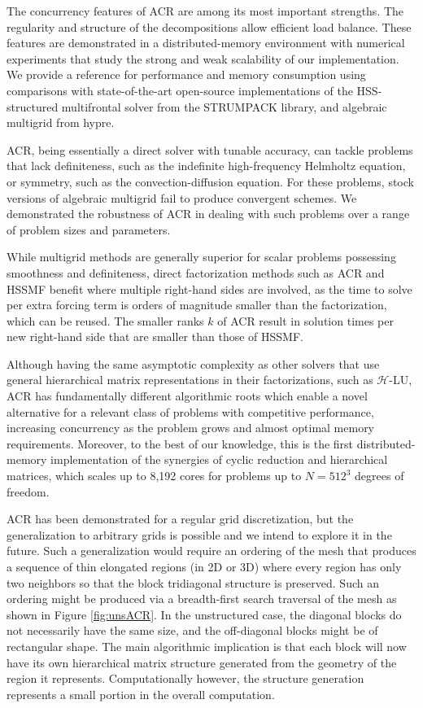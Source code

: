 \documentclass[]{elsarticle}
\begin{document}
The concurrency features of ACR are among its most important strengths. The regularity and structure of the decompositions allow efficient load balance. These features are demonstrated in a distributed-memory environment with numerical experiments that study the strong and weak scalability of our implementation. We provide a reference for performance and memory consumption using comparisons with state-of-the-art open-source implementations of the HSS-structured multifrontal solver from the STRUMPACK library, and algebraic multigrid from hypre. 

ACR, being essentially a direct solver with tunable accuracy, can tackle problems that lack definiteness, such as the indefinite high-frequency Helmholtz equation, or symmetry, such as the convection-diffusion equation.
For these problems, stock versions of algebraic multigrid fail to produce convergent schemes. We demonstrated the robustness of ACR in dealing with such problems over a range of problem sizes and parameters.

While multigrid methods are generally superior for scalar problems possessing smoothness and definiteness, direct factorization methods such as ACR and HSSMF benefit where multiple right-hand sides are involved, as the time to solve per extra forcing term is orders of magnitude smaller than the factorization, which can be reused. The smaller ranks $k$ of ACR result in solution times per new right-hand side that are smaller than those of HSSMF.

Although having the same asymptotic complexity as other solvers that use general hierarchical matrix representations in their factorizations, such as $\mathcal{H}$-LU, ACR has fundamentally different algorithmic roots which enable a novel alternative for a relevant class of problems with competitive performance, increasing concurrency as the problem grows and almost optimal memory requirements. Moreover, to the best of our knowledge, this is the first distributed-memory implementation of the synergies of cyclic reduction and hierarchical matrices, which scales up to 8,192 cores for problems up to $N=512^3$ degrees of freedom.

ACR has been demonstrated for a regular grid discretization, but the generalization to arbitrary grids is possible and we intend to explore it in the future. Such a generalization would require an ordering of the mesh that produces a sequence of thin elongated regions (in 2D or 3D) where every region has only two neighbors so that the block tridiagonal structure is preserved. Such an ordering might be produced via a breadth-first search traversal of the mesh as shown in Figure \ref{fig:unsACR}. In the unstructured case, the diagonal blocks do not necessarily have the same size, and the off-diagonal blocks might be of rectangular shape. The main algorithmic implication is that each block will now have its own hierarchical matrix structure generated from the geometry of the region it represents. Computationally however, the structure generation represents a small portion in the overall computation.
\end{document}
